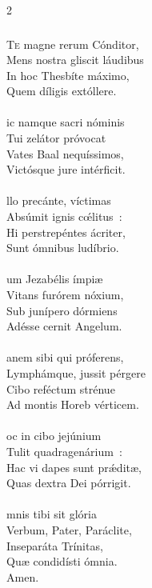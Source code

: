 \documentclass[9pt,twoside]{extarticle}
\begin{document}
\begin{multicols}{2}
{{{\subsubsection*{\center {}}
\lettrine{T}e magne rerum Cónditor,\\
Mens nostra gliscit láudibus\\
In hoc Thesbíte máximo,\\
Quem díligis extóllere.\\
\\
ic namque sacri nóminis\\
Tui zelátor próvocat\\
Vates Baal nequíssimos,\\
Victósque jure intérficit.\\
\\
llo precánte, víctimas\\
Absúmit ignis cœ́litus~:\\
Hi perstrepéntes ácriter,\\
Sunt ómnibus ludíbrio.\\
\\
um Jezabélis ímpiæ\\
Vitans furórem nóxium,\\
Sub junípero dórmiens \\
Adésse cernit Angelum.\\
\\
anem sibi qui próferens,\\
Lymphámque, jussit pérgere\\
Cibo reféctum strénue\\
Ad montis Horeb vérticem.\\
\\
oc in cibo jejúnium\\
Tulit quadragenárium~:\\
Hac vi dapes sunt prǽditæ,\\
Quas dextra Dei pórrigit.\\
\\
mnis tibi sit glória\\
Verbum, Pater, Paráclite,\\
Inseparáta Trínitas,\\
Quæ condidísti ómnia.\\
Amen.

}}}
\end{multicols}
\end{document}
